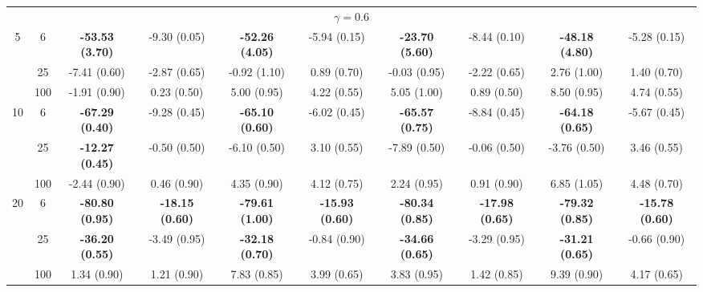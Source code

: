 \documentclass[
  man]{apa6}
\newenvironment{lltable}{\begin{landscape}\centering\begin{ThreePartTable}}{\end{ThreePartTable}\end{landscape}}
\begin{document}
\begin{lltable}
{\begin{longtable}{cccccccccc}
\multicolumn{10}{c}{$\gamma = 0.6$}\\
5 & 6 & \textbf{-53.53 (3.70)} & -9.30 (0.05) & \textbf{-52.26 (4.05)} & -5.94 (0.15) & \textbf{-23.70 (5.60)} & -8.44 (0.10) & \textbf{-48.18 (4.80)} & -5.28 (0.15)\\
 & 25 & -7.41 (0.60) & -2.87 (0.65) & -0.92 (1.10) & 0.89 (0.70) & -0.03 (0.95) & -2.22 (0.65) & 2.76 (1.00) & 1.40 (0.70)\\
 & 100 & -1.91 (0.90) & 0.23 (0.50) & 5.00 (0.95) & 4.22 (0.55) & 5.05 (1.00) & 0.89 (0.50) & 8.50 (0.95) & 4.74 (0.55)\\
10 & 6 & \textbf{-67.29 (0.40)} & -9.28 (0.45) & \textbf{-65.10 (0.60)} & -6.02 (0.45) & \textbf{-65.57 (0.75)} & -8.84 (0.45) & \textbf{-64.18 (0.65)} & -5.67 (0.45)\\
 & 25 & \textbf{-12.27 (0.45)} & -0.50 (0.50) & -6.10 (0.50) & 3.10 (0.55) & -7.89 (0.50) & -0.06 (0.50) & -3.76 (0.50) & 3.46 (0.55)\\
 & 100 & -2.44 (0.90) & 0.46 (0.90) & 4.35 (0.90) & 4.12 (0.75) & 2.24 (0.95) & 0.91 (0.90) & 6.85 (1.05) & 4.48 (0.70)\\
20 & 6 & \textbf{-80.80 (0.95)} & \textbf{-18.15 (0.60)} & \textbf{-79.61 (1.00)} & \textbf{-15.93 (0.60)} & \textbf{-80.34 (0.85)} & \textbf{-17.98 (0.65)} & \textbf{-79.32 (0.85)} & \textbf{-15.78 (0.60)}\\
 & 25 & \textbf{-36.20 (0.55)} & -3.49 (0.95) & \textbf{-32.18 (0.70)} & -0.84 (0.90) & \textbf{-34.66 (0.65)} & -3.29 (0.95) & \textbf{-31.21 (0.65)} & -0.66 (0.90)\\
 & 100 & 1.34 (0.90) & 1.21 (0.90) & 7.83 (0.85) & 3.99 (0.65) & 3.83 (0.95) & 1.42 (0.85) & 9.39 (0.90) & 4.17 (0.65)\\
\bottomrule
\end{longtable}

}

\end{lltable}
\end{document}
